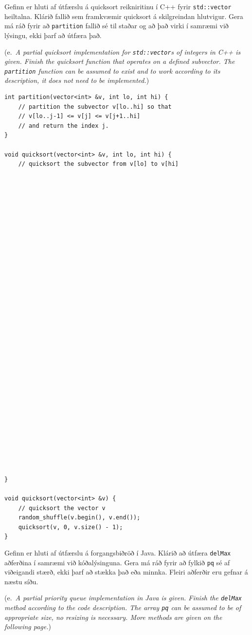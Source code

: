 \documentclass[addpoints]{exam}
\newcommand{\eng}[1]{(e.\ \emph{#1})}
\begin{document}
\begin{questions}
	\newpage

	\question[4] Gefinn er hluti af útfærslu á quicksort reikniritinu í C++ fyrir \texttt{std::vector} heiltalna. Klárið fallið sem framkvæmir quicksort á skilgreindan hlutvigur. Gera má ráð fyrir að \texttt{partition} fallið sé til staðar og að það virki í samræmi við lýsingu, ekki þarf að útfæra það.

	\eng{A partial quicksort implementation for \texttt{std::vector}s of integers in C++ is given. Finish the quicksort function that operates on a defined subvector. The \texttt{partition} function can be assumed to exist and to work according to its description, it does not need to be implemented.}

	\begin{verbatim}
int partition(vector<int> &v, int lo, int hi) {
    // partition the subvector v[lo..hi] so that 
    // v[lo..j-1] <= v[j] <= v[j+1..hi] 
    // and return the index j.
}

void quicksort(vector<int> &v, int lo, int hi) {
    // quicksort the subvector from v[lo] to v[hi]
    
    
    
    
    
    
    
    
    
    
    
    
    
    
    
    
    
    
    
    
    
    
    
    
    
    
    
    
    
    
    
    
}

void quicksort(vector<int> &v) {
    // quicksort the vector v
    random_shuffle(v.begin(), v.end());
    quicksort(v, 0, v.size() - 1);
}
\end{verbatim}

	\question[4] Gefinn er hluti af útfærslu á forgangsbiðröð í Java. Klárið að útfæra \texttt{delMax} aðferðina í samræmi við kóðalýsinguna. Gera má ráð fyrir að fylkið \texttt{pq} sé af viðeigandi stærð, ekki þarf að stækka það eða minnka. Fleiri aðferðir eru gefnar á næstu síðu.

	\eng{A partial priority queue implementation in Java is given. Finish the \texttt{delMax} method according to the code description. The array \texttt{pq} can be assumed to be of appropriate size, no resizing is necessary. More methods are given on the following page.}


\end{questions}
\end{document}

